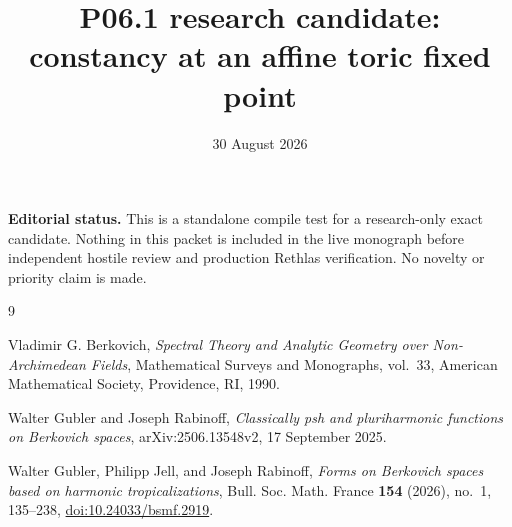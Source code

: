 \documentclass[11pt]{article}
\title{P06.1 research candidate: constancy at an affine toric fixed point}
\author{}
\date{30 August 2026}
\begin{document}
\maketitle

\noindent
\textbf{Editorial status.}
This is a standalone compile test for a research-only exact candidate.
Nothing in this packet is included in the live monograph before independent
hostile review and production Rethlas verification.  No novelty or priority
claim is made.




\begin{thebibliography}{9}

Vladimir G. Berkovich,
\emph{Spectral Theory and Analytic Geometry over Non-Archimedean Fields},
Mathematical Surveys and Monographs, vol.~33, American Mathematical Society,
Providence, RI, 1990.

Walter Gubler and Joseph Rabinoff,
\emph{Classically psh and pluriharmonic functions on Berkovich spaces},
arXiv:2506.13548v2, 17 September 2025.

Walter Gubler, Philipp Jell, and Joseph Rabinoff,
\emph{Forms on Berkovich spaces based on harmonic tropicalizations},
Bull. Soc. Math. France \textbf{154} (2026), no.~1, 135--238,
\href{https://doi.org/10.24033/bsmf.2919}{doi:10.24033/bsmf.2919}.

\end{thebibliography}
\end{document}
